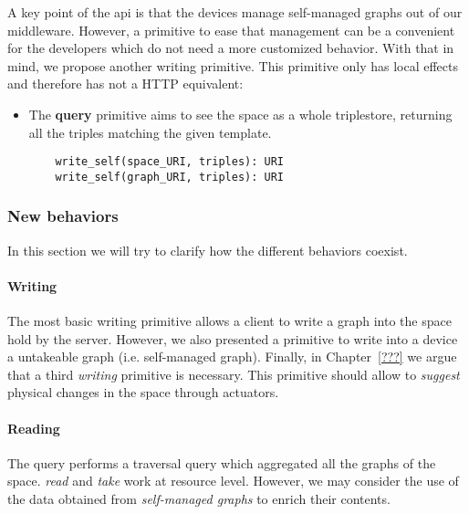 A key point of the \ac{api} is that the devices manage self-managed graphs out of our middleware.
However, a primitive to ease that management can be a convenient for the developers which do not need a more customized behavior.
With that in mind, we propose another writing primitive.
This primitive only has local effects and therefore has not a HTTP equivalent:
\begin{itemize}
  \item The \textbf{query} primitive aims to see the space as a whole triplestore, returning all the triples matching the given template.
  
  \begin{lstlisting}
    write_self(space_URI, triples): URI
    write_self(graph_URI, triples): URI
  \end{lstlisting}
\end{itemize}



\subsubsection{New behaviors}

In this section we will try to clarify how the different behaviors coexist.

\paragraph{Writing}

The most basic writing primitive allows a client to write a graph into the space hold by the server.
However, we also presented a primitive to write into a device a untakeable graph (i.e. self-managed graph).
Finally, in Chapter~\ref{???} we argue that a third \emph{writing} primitive is necessary.
This primitive should allow to \emph{suggest} physical changes in the space through actuators.



\paragraph{Reading}

The query performs a traversal query which aggregated all the graphs of the space.
\emph{read} and \emph{take} work at resource level.
However, we may consider the use of the data obtained from \emph{self-managed graphs} to enrich their contents. %